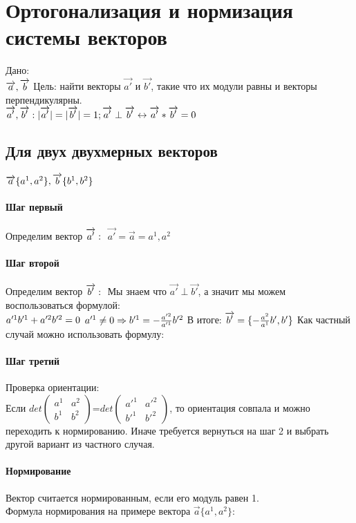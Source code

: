 \documentclass{article}
\begin{document}
\section{Ортогонализация и нормизация системы векторов}
Дано:\\
$\overrightarrow{a},\overrightarrow{b}\\$
Цель: найти векторы $\overrightarrow{a'}$ и $\overrightarrow{b'}$, такие что их модули равны и векторы перпендикулярны.\\
$\overrightarrow{a'},\overrightarrow{b'} : |\overrightarrow{a'}|=|\overrightarrow{b'}|=1;\overrightarrow{a'}\perp\overrightarrow{b'} \leftrightarrow \overrightarrow{a'}*\overrightarrow{b'}=0\\$
\subsection{Для двух двухмерных векторов}
$\overrightarrow{a}\{a^1,a^2\}, \overrightarrow{b}\{b^1,b^2\}\\$
\paragraph*{Шаг первый}
Определим вектор $\overrightarrow{a'}:\\$
$\overrightarrow{a'}=\overrightarrow{a}={a^1,a^2}$
\paragraph*{Шаг второй}
Определим вектор $\overrightarrow{b'}:\\$
Мы знаем что $\overrightarrow{a'}\perp\overrightarrow{b'}$, а значит мы можем воспользоваться формулой:\\
$a'^1b'^1+a'^2b'^2=0\\$
$a'^1\neq0 \Rightarrow b'^1=-\frac{a'^2}{a'^1}b'^2\\$
В итоге: $\overrightarrow{b'}=\{-\frac{a^2}{a^1}b',b'\}\\$
Как частный случай можно использовать формулу:
\paragraph*{Шаг третий}
Проверка ориентации:\\
Если 
$det
    \begin{pmatrix}
        {a^1} & {a^2}\\
        {b^1} & {b^2}
    \end{pmatrix}
$=$det
\begin{pmatrix}
    {a'^1} & {a'^2}\\
    {b'^1} & {b'^2}
\end{pmatrix}
$, то ориентация совпала и можно переходить к нормированию. Иначе требуется вернуться на шаг 2 и выбрать другой вариант из частного случая.
\paragraph*{Нормирование}
Вектор считается нормированным, если его модуль равен 1.\\
Формула нормирования на примере вектора $\overrightarrow{a}\{a^1,a^2\}$:
\end{document}
